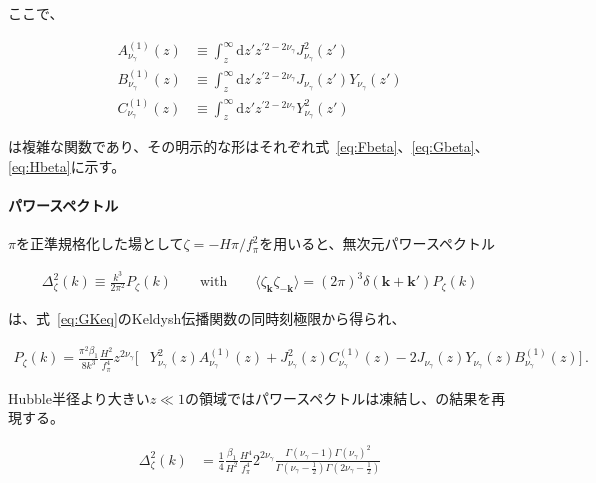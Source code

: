 \documentclass[a4paper,11pt]{ltjsarticle}
\numberwithin{equation}{section}
\newcommand{\dd}{\mathrm{d}}
\newcommand{\boldmathsymbol}[1]{{\ensuremath{\boldsymbol{#1}}}}
\newcommand{\bmk}{\boldmathsymbol{k}}
\newcommand{\Eq}[1]{Eq.~(\ref{#1})}
\newcommand{\Eqs}[1]{Eqs.~(\ref{#1})}
\def\bmk{{\boldsymbol{k}}}
\renewcommand{\Eq}[1]{式~\eqref{#1}}
\renewcommand{\Eqs}[1]{式~\eqref{#1}}
\begin{document}
ここで、

\begin{align}
        A^{(1)}_{\nu_\gamma}(z) &\equiv \int_{z}^{\infty} \dd z' z^{\prime2 - 2{\nu_\gamma}} J^2_{\nu_\gamma}(z')  \label{eq:Fbetaref}\\
        B^{(1)}_{\nu_\gamma}(z) &\equiv \int_{z}^{\infty} \dd z' z^{\prime2 - 2{\nu_\gamma}} J_{\nu_\gamma}(z') Y_{\nu_\gamma}(z') \label{eq:Gbetaref} \\
        C^{(1)}_{\nu_\gamma}(z)&\equiv \int_{z}^{\infty} \dd z' z^{\prime2 - 2{\nu_\gamma}} Y^2_{\nu_\gamma}(z') \label{eq:Hbetaref}
\end{align}

は複雑な関数であり、その明示的な形はそれぞれ\Eqs{eq:Fbeta}、\eqref{eq:Gbeta}、\eqref{eq:Hbeta}に示す。

\paragraph{パワースペクトル} $\pi$を正準規格化した場として$\zeta=-H\pi/f_\pi^2$を用いると、無次元パワースペクトル

\begin{align}
\Delta^2_\zeta(k) \equiv \frac{k^3}{2\pi^2}P_\zeta(k) \qquad \mathrm{with} \qquad \langle \zeta_\bmk \zeta_{-\bmk}\rangle = (2\pi)^3 \delta(\bmk + \bmk') P_\zeta(k)
\end{align}

は、\Eq{eq:GKeq}のKeldysh伝播関数の同時刻極限から得られ、

\begin{align}\label{eq:PKref}
P_\zeta(k) = \frac{\pi^2\beta_1}{8 k^3}  \frac{H^2}{f_\pi^4} z^{2{\nu_\gamma}} \Big[& Y^2_{\nu_\gamma}(z)  A^{(1)}_{\nu_\gamma}(z) + J^2_{\nu_\gamma}(z) C^{(1)}_{\nu_\gamma}(z) -2J_{\nu_\gamma}(z)Y_{\nu_\gamma}(z) B^{(1)}_{\nu_\gamma}(z) \Big]\,.
\end{align}

Hubble半径より大きい$z\ll1$の領域ではパワースペクトルは凍結し、\cite{Creminelli:2023aly}の結果を再現する。

\begin{align}
\Delta^2_\zeta(k) &= \frac{1}{4} \frac{\beta_1}{H^2}   \frac{H^4}{f_\pi^4}  2^{2\nu_\gamma} \frac{\Gamma\left(\nu_\gamma-1\right)\Gamma\left(\nu_\gamma\right)^2}{\Gamma\left(\nu_\gamma - \frac{1}{2}\right)\Gamma\left(2\nu_\gamma - \frac{1}{2}\right)}\label{eq:PK1SH}
\end{align}
\end{document}

